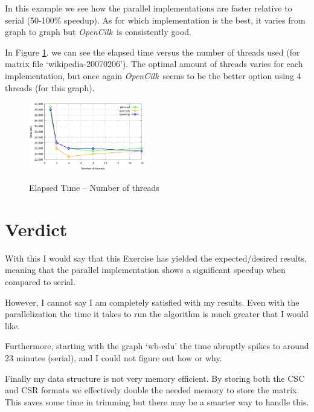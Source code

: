 \documentclass[10pt, a4paper]{article}
\newcommand{\cilk}{\textit{OpenCilk}}
\begin{document}
In this example we see how the parallel implementations are faster relative to serial (50-100\% speedup). 
As for which implementation is the best, it varies from graph to graph but \cilk \ is consistently good.

In Figure \ref{threads}. we can see the elapsed time versus the number of threads used (for matrix file 
`wikipedia-20070206'). The optimal amount of threads varies for each implementation, but once again
\cilk \ seems to be the better option using 4 threads (for this graph).

\begin{figure}[h]
	\centering
	\caption{Elapsed Time -- Number of threads}
	\includegraphics[width=0.45\textwidth]{threads}
	\label{threads}
\end{figure}

\section{Verdict}

With this I would say that this Exercise has yielded the expected/desired results, meaning that the parallel
implementation shows a significant speedup when compared to serial. 

However, I cannot say I am completely satisfied with my results. Even with the parallelization the time it 
takes to run the algorithm is much greater that I would like.

Furthermore, starting with the graph `wb-edu' the time abruptly spikes
to around 23 minutes (serial), and I could not figure out how or why.

Finally my data structure is not very memory efficient. By storing both the CSC and CSR formats 
we effectively double the needed memory to store the matrix. This saves some time in trimming but there may
be a smarter way to handle this.

\printbibliography
\end{document}

